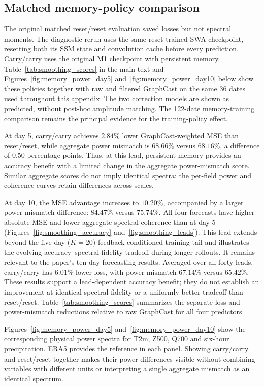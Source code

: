 \documentclass{article}
\newcommand{\vfourred}[1]{{\color{red}#1}}
\begin{document}
\FloatBarrier
\subsection{\vfourred{Matched memory-policy comparison}}
\label{app:smoothing_reset}

\vfourred{The original matched reset/reset evaluation saved losses but not spectral moments. The diagnostic rerun uses the same reset-trained SWA checkpoint, resetting both its SSM state and convolution cache before every prediction. Carry/carry uses the original M1 checkpoint with persistent memory. Table~\ref{tab:smoothing_scores} in the main text and Figures~\ref{fig:memory_power_day5} and~\ref{fig:memory_power_day10} below show these policies together with raw and filtered GraphCast on the same 36 dates used throughout this appendix. The two correction models are shown as predicted, without post-hoc amplitude matching. The 122-date memory-training comparison remains the principal evidence for the training-policy effect.}

\vfourred{At day 5, carry/carry achieves $2.84\%$ lower GraphCast-weighted MSE than reset/reset, while aggregate power mismatch is $68.66\%$ versus $68.16\%$, a difference of $0.50$ percentage points. Thus, at this lead, persistent memory provides an accuracy benefit with a limited change in the aggregate power-mismatch score. Similar aggregate scores do not imply identical spectra: the per-field power and coherence curves retain differences across scales.}

\vfourred{At day 10, the MSE advantage increases to $10.20\%$, accompanied by a larger power-mismatch difference: $84.47\%$ versus $75.74\%$. All four forecasts have higher absolute MSE and lower aggregate spectral coherence than at day 5 (Figures~\ref{fig:smoothing_accuracy} and~\ref{fig:smoothing_leads}). This lead extends beyond the five-day ($K=20$) feedback-conditioned training tail and illustrates the evolving accuracy--spectral-fidelity tradeoff during longer rollouts. It remains relevant to the paper's ten-day forecasting results. Averaged over all forty leads, carry/carry has $6.01\%$ lower loss, with power mismatch $67.14\%$ versus $65.42\%$. These results support a lead-dependent accuracy benefit; they do not establish an improvement at identical spectral fidelity or a uniformly better tradeoff than reset/reset. Table~\ref{tab:smoothing_scores} summarizes the separate loss and power-mismatch reductions relative to raw GraphCast for all four predictors.}

\vfourred{Figures~\ref{fig:memory_power_day5} and~\ref{fig:memory_power_day10} show the corresponding physical power spectra for T2m, Z500, Q700 and six-hour precipitation. ERA5 provides the reference in each panel. Showing carry/carry and reset/reset together makes their power differences visible without combining variables with different units or interpreting a single aggregate mismatch as an identical spectrum.}
\end{document}
